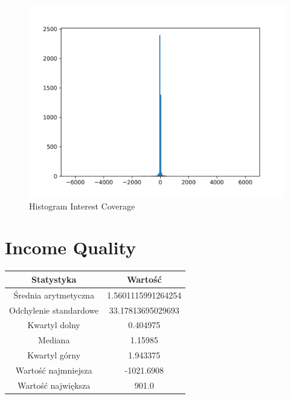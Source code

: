\documentclass{article}
\begin{document}
\begin{figure}[h!]
    \includegraphics[width=\linewidth]{variables/Interest Coverage.png}
    \caption{Histogram Interest Coverage }
\end{figure}\section{ Income Quality }

\begin{center}
    \begin{tabular}{|c | c|} 
    \hline
    Statystyka & Wartość \\
    \hline\hline
    Średnia arytmetyczna & 1.5601115991264254 \\ 
    \hline
    Odchylenie standardowe & 33.17813695029693 \\
    \hline
    Kwartyl dolny & 0.404975 \\
    \hline
    Mediana & 1.15985 \\
    \hline
    Kwartyl górny & 1.943375 \\
    \hline
    Wartość najmniejsza & -1021.6908 \\
    \hline
    Wartość największa & 901.0 \\
    \hline
   \end{tabular}
\end{center}
\end{document}

